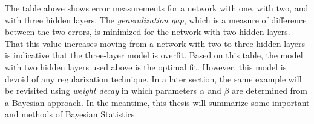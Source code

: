The table above shows error measurements for a network with one, with two, and with three hidden layers.  The \textit{generalization gap}, which is a measure of difference between the two errors, is minimized for the network with two hidden layers.  That this value increases moving from a network with two to three hidden layers is indicative that the three-layer model is overfit.  Based on this table, the model with two hidden layers used above is the optimal fit.  However, this model is devoid of any regularization technique.  In a later section, the same example will be revisited using \textit{weight decay} in which parameters $\alpha$ and $\beta$ are determined from a Bayesian approach.  In the meantime, this thesis will summarize some important and methods of Bayesian Statistics.